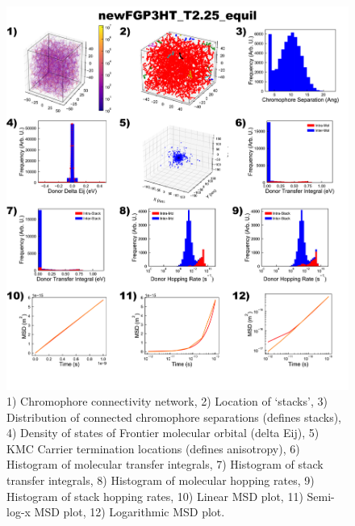 \documentclass[12pt]{article}
\begin{document}
\begin{figure}[h]\centering
	\includegraphics[width=\textwidth]{Figures/newFGP3HT_T2.25_equil.png}
    \caption{   1) Chromophore connectivity network, 
                2) Location of `stacks', 
                3) Distribution of connected chromophore separations (defines stacks),
                4) Density of states of Frontier molecular orbital (delta Eij),
                5) KMC Carrier termination locations (defines anisotropy),
                6) Histogram of molecular transfer integrals,
                7) Histogram of stack transfer integrals,
                8) Histogram of molecular hopping rates,
                9) Histogram of stack hopping rates,
                10) Linear MSD plot,
                11) Semi-log-x MSD plot,
                12) Logarithmic MSD plot.}
	\label{fig:EqlT2.25}
\end{figure}
\end{document}
